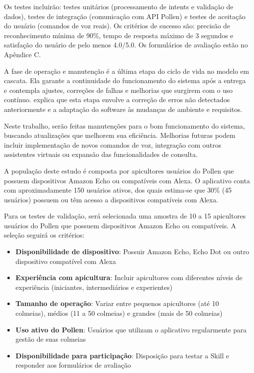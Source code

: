 Os testes incluirão: testes unitários (processamento de intents e validação de dados), testes de integração (comunicação com API Pollen) e testes de aceitação do usuário (comandos de voz reais). Os critérios de sucesso são: precisão de reconhecimento mínima de 90\%, tempo de resposta máximo de 3 segundos e satisfação do usuário de pelo menos 4.0/5.0. Os formulários de avaliação estão no Apêndice C.

\label{sssec:operação}

A fase de operação e manutenção é a última etapa do ciclo de vida no modelo em cascata. Ela garante a continuidade do funcionamento do sistema após a entrega e contempla ajustes, correções de falhas e melhorias que surgirem com o uso contínuo. \textcite{pressman2016} explica que esta etapa envolve a correção de erros não detectados anteriormente e a adaptação do software às mudanças de ambiente e requisitos.

Neste trabalho, serão feitas manutenções para o bom funcionamento do sistema, buscando atualizações que melhorem sua eficiência. Melhorias futuras podem incluir implementação de novos comandos de voz, integração com outros assistentes virtuais ou expansão das funcionalidades de consulta.

\label{sec:esboco-projeto-pratica}

A população deste estudo é composta por apicultores usuários do Pollen que possuem dispositivos Amazon Echo ou compatíveis com Alexa. O aplicativo conta com aproximadamente 150 usuários ativos, dos quais estima-se que 30\% (45 usuários) possuem ou têm acesso a dispositivos compatíveis com Alexa.

Para os testes de validação, será selecionada uma amostra de 10 a 15 apicultores usuários do Pollen que possuem dispositivos Amazon Echo ou compatíveis. A seleção seguirá os critérios:

\begin{itemize}
    \item \textbf{Disponibilidade de dispositivo}: Possuir Amazon Echo, Echo Dot ou outro dispositivo compatível com Alexa
    \item \textbf{Experiência com apicultura}: Incluir apicultores com diferentes níveis de experiência (iniciantes, intermediários e experientes)
    \item \textbf{Tamanho de operação}: Variar entre pequenos apicultores (até 10 colmeias), médios (11 a 50 colmeias) e grandes (mais de 50 colmeias)
    \item \textbf{Uso ativo do Pollen}: Usuários que utilizam o aplicativo regularmente para gestão de suas colmeias
    \item \textbf{Disponibilidade para participação}: Disposição para testar a Skill e responder aos formulários de avaliação
\end{itemize}

